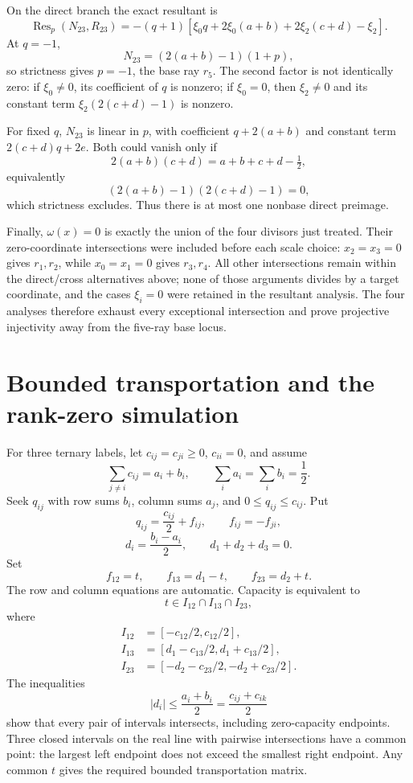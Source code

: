 On the direct branch the exact resultant is
\[
\operatorname{Res}_p(N_{23},R_{23})
=-(q+1)\left[
\xi_0q+2\xi_0(a+b)+2\xi_2(c+d)-\xi_2
\right].
\]
At \(q=-1\),
\[
N_{23}=(2(a+b)-1)(1+p),
\]
so strictness gives \(p=-1\), the base ray \(r_5\). The second factor is not
identically zero: if \(\xi_0\ne0\), its coefficient of \(q\) is nonzero; if
\(\xi_0=0\), then \(\xi_2\ne0\) and its constant term
\(\xi_2(2(c+d)-1)\) is nonzero.

For fixed \(q\), \(N_{23}\) is linear in \(p\), with coefficient
\(q+2(a+b)\) and constant term \(2(c+d)q+2e\). Both could vanish only if
\[
2(a+b)(c+d)=a+b+c+d-\tfrac12,
\]
equivalently
\[
(2(a+b)-1)(2(c+d)-1)=0,
\]
which strictness excludes. Thus there is at most one nonbase direct preimage.

Finally, \(\omega(x)=0\) is exactly the union of the four divisors just
treated. Their zero-coordinate intersections were included before each scale
choice: \(x_2=x_3=0\) gives \(r_1,r_2\), while
\(x_0=x_1=0\) gives \(r_3,r_4\). All other intersections remain within the
direct/cross alternatives above; none of those arguments divides by a target
coordinate, and the cases \(\xi_i=0\) were retained in the resultant
analysis. The four analyses therefore exhaust every exceptional intersection
and prove projective injectivity away from the five-ray base locus.

\section{Bounded transportation and the rank-zero simulation}
\label{app:transport}

For three ternary labels, let \(c_{ij}=c_{ji}\ge0\), \(c_{ii}=0\), and assume
\[
\sum_{j\ne i}c_{ij}=a_i+b_i,\qquad
\sum_i a_i=\sum_i b_i=\frac12.
\]
Seek \(q_{ij}\) with row sums \(b_i\), column sums \(a_j\), and
\(0\le q_{ij}\le c_{ij}\). Put
\[
q_{ij}=\frac{c_{ij}}2+f_{ij},\qquad f_{ij}=-f_{ji},
\]
\[
d_i=\frac{b_i-a_i}{2},\qquad d_1+d_2+d_3=0.
\]
Set
\[
f_{12}=t,\qquad f_{13}=d_1-t,\qquad f_{23}=d_2+t.
\]
The row and column equations are automatic. Capacity is equivalent to
\[
t\in I_{12}\cap I_{13}\cap I_{23},
\]
where
\[
\begin{aligned}
I_{12}&=[-c_{12}/2,c_{12}/2],\\
I_{13}&=[d_1-c_{13}/2,d_1+c_{13}/2],\\
I_{23}&=[-d_2-c_{23}/2,-d_2+c_{23}/2].
\end{aligned}
\]
The inequalities
\[
|d_i|\le\frac{a_i+b_i}{2}
=\frac{c_{ij}+c_{ik}}2
\]
show that every pair of intervals intersects, including zero-capacity
endpoints. Three closed intervals on the real line with pairwise
intersections have a common point: the largest left endpoint does not exceed
the smallest right endpoint. Any common \(t\) gives the required bounded
transportation matrix.

